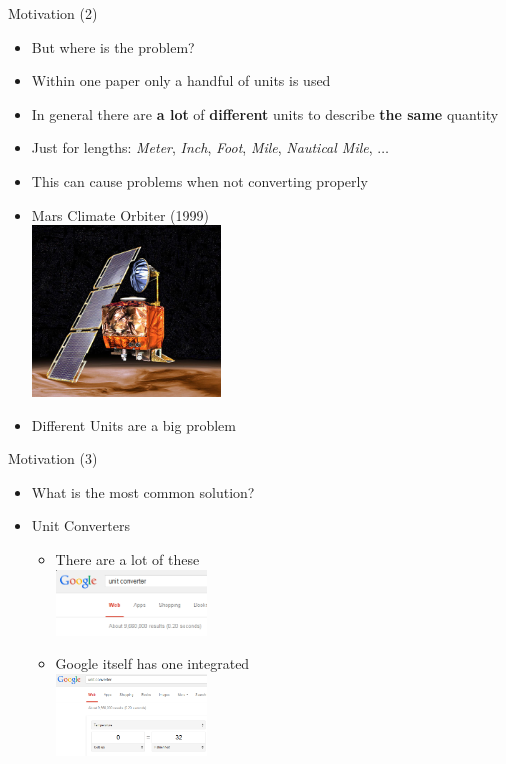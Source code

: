 \documentclass{beamer}
\begin{document}
  \begin{frame}{Motivation (2)}
    \begin{itemize}[<+->]
      \item But where is the problem?
      \item Within one paper only a handful of units is used
      \item In general there are \textbf{a lot} of \textbf{different} units to describe \textbf{the same} quantity
      \item Just for lengths: \pause \textit{Meter}, \pause \textit{Inch}, \pause \textit{Foot}, \pause \textit{Mile}, \pause \textit{Nautical Mile}, \pause $\dots$
      \item This can cause problems when not converting properly
      \item Mars Climate Orbiter (1999) \\ \includegraphics[width=50mm]{imgs/mco.jpg}
      \item Different Units are a big problem
    \end{itemize}
  \end{frame}

  \begin{frame}{Motivation (3)}
    \pause
    \begin{itemize}[<+->]
      \item What is the most common solution?
      \item Unit Converters
      \begin{itemize}[<+->]
        \item There are a lot of these \\ \includegraphics[width=40mm]{imgs/google.png}
        \item Google itself has one integrated \\ \includegraphics[width=40mm]{imgs/googleuc.png}
      \end{itemize}
    \end{itemize}
  \end{frame}
\end{document}
